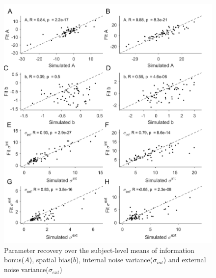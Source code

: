 \documentclass[12pt]{article}
\begin{document}
	\begin{figure}[H]
		\begin{center}
			\includegraphics[width=1\textwidth]{figures/precover.png}
			\caption{Parameter recovery over the subject-level means of information bonus($A$), spatial bias($b$), internal noise variance($\sigma_{int}$) and external noise variance($\sigma_{ext}$) %
			}
			\label{fig:pararecover1}
		\end{center}
	\end{figure} 
\end{document}

